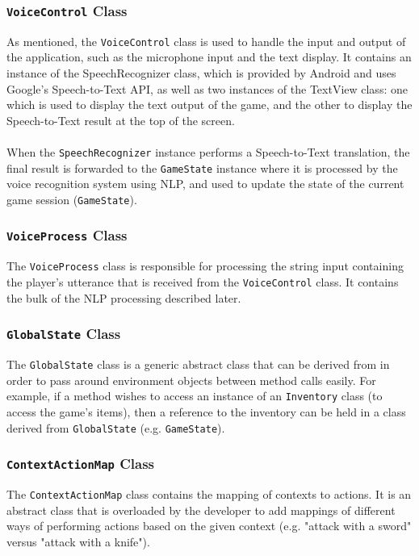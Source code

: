 \documentclass[12pt]{article}
\begin{document}
\subsubsection{\texttt{VoiceControl} Class}

As mentioned, the \texttt{VoiceControl} class is used to handle the input and output of the application, such as the microphone input and the text display. It contains an instance of the SpeechRecognizer class, which is provided by Android and uses Google's Speech-to-Text API, as well as two instances of the TextView class: one which is used to display the text output of the game, and the other to display the Speech-to-Text result at the top of the screen.
\\
\\
When the \texttt{SpeechRecognizer} instance performs a Speech-to-Text translation, the final result is forwarded to the \texttt{GameState} instance where it is processed by the voice recognition system using NLP, and used to update the state of the current game session (\texttt{GameState}).

\subsubsection{\texttt{VoiceProcess} Class}

The \texttt{VoiceProcess} class is responsible for processing the string input containing the player's utterance that is received from the \texttt{VoiceControl} class. It contains the bulk of the NLP processing described later.

\subsubsection{\texttt{GlobalState} Class}

The \texttt{GlobalState} class is a generic abstract class that can be derived from in order to pass around environment objects between method calls easily. For example, if a method wishes to access an instance of an \texttt{Inventory} class (to access the game's items), then a reference to the inventory can be held in a class derived from \texttt{GlobalState} (e.g. \texttt{GameState}).

\subsubsection{\texttt{ContextActionMap} Class}

The \texttt{ContextActionMap} class contains the mapping of contexts to actions. It is an abstract class that is overloaded by the developer to add mappings of different ways of performing actions based on the given context (e.g. "attack with a sword" versus "attack with a knife").
\end{document}
